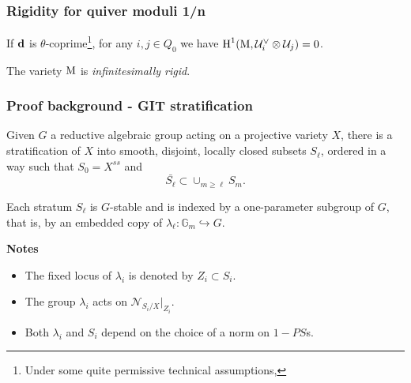 \documentclass{beamer}
\begin{document}
\begin{frame}
    \frametitle{Rigidity for quiver moduli 1/n}
\begin{theorem}
If $\mathbf{d}$ is $\theta$-coprime\footnote{Under some quite permissive technical assumptions,}, for any $i, j \in Q_0$ we have
$\operatorname{H}^{1}(\operatorname{M}, \mathcal{U}^{\vee}_{i} \otimes \mathcal{U}_j) = 0$.
\end{theorem} \pause
\begin{corollary}
The variety $\operatorname{M}$ is \emph{infinitesimally rigid}.    
\end{corollary}
\end{frame}

\begin{frame}
    \frametitle{Proof background - GIT stratification}
\begin{theorem}
Given $G$ a reductive
algebraic group acting on a projective variety $X$,
there is a stratification of $X$
into smooth, disjoint, locally closed subsets $S_{\ell}$,
ordered in a way such that $S_0 = X^{ss}$ and
\[\bar{S_{\ell}} \subset \cup_{m \geq \ell} S_m.\]
\end{theorem} \pause

Each stratum $S_{\ell}$ is $G$-stable and is indexed by
a one-parameter subgroup of $G$,
that is, by an embedded copy of
$\lambda_{\ell} \colon \mathbb{G}_m \hookrightarrow G$. \pause

{\bf Notes} \pause
\begin{itemize}
    \item The fixed locus of $\lambda_i$ is denoted by $Z_i \subset S_i$. \pause
    \item The group $\lambda_i$ acts on $\mathcal{N}_{S_i/X}|_{Z_i}$. \pause
    \item Both $\lambda_i$ and $S_i$ depend on the choice of a norm on $1-PS$s.
\end{itemize}

\end{frame}
\end{document}
